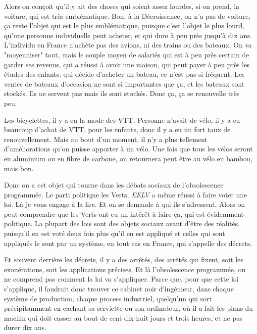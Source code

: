 \begin{small}
\smallbreak
Alors on conçoit qu'il y ait des choses qui soient assez lourdes, si on prend, la voiture, qui est très emblématique. Bon, à la Décroissance, on n'a pas de voiture, ça reste l'objet qui est le plus emblématique, puisque c'est l'objet le plus lourd, qu'une personne individuelle peut acheter, et qui dure à peu près jusqu'à dix ans. L'individu en France n'achète pas des avions, ni des trains ou des bateaux. On va "moyenniser" tout, mais le couple moyen de salariés qui est à peu près certain de garder ses revenus, qui a réussi à avoir une maison, qui peut payer à peu près les études des enfants, qui décide d'acheter un bateau, ce n’est pas si fréquent. Les ventes de bateaux d'occasion ne sont si importantes que ça, et les bateaux sont stockés. Ils ne servent pas mais ils sont stockés. Donc ça, ça se renouvelle très peu. 

Les bicyclettes, il y a eu la mode des VTT. Personne n'avait de vélo, il y a eu beaucoup d'achat de VTT, pour les enfants, donc il y a eu un fort taux de renouvellement. Mais au bout d'un moment, il n'y a plus tellement d'améliorations qu'on puisse apporter à un vélo. Une fois que tous les vélos seront en aluminium ou en fibre de carbone, on retournera peut être au vélo en bambou, mais bon. 

\smallbreak
Donc on a cet objet qui tourne dans les débats sociaux de l'obsolescence programmée. Le parti politique les Verts, \textit{EELV} a même réussi à faire voter une loi. Là je vous engage à la lire. Et on se demande à qui ils s'adressent. Alors on peut comprendre que les Verts ont eu un intérêt à faire ça, qui est évidemment politique. La plupart des lois sont des objets sociaux avant d'être des réalités, puisqu'il en est voté deux fois plus qu'il en est appliqué et celles qui sont appliqués le sont par un système, en tout cas en France, qui s'appelle des décrets. 

Et souvent derrière les décrets, il y a des arrêtés, des arrêtés qui fixent, soit les exonérations, soit les applications précises. Et là l'obsolescence programmée, on ne comprend pas comment la loi va s'appliquer. Parce que, pour que cette loi s'applique, il faudrait donc trouver ce cabinet noir d'ingénieur, dans chaque système de production, chaque process industriel, quelqu'un qui sort précipitamment en cachant sa serviette ou son ordinateur, où il a fait les plans du machin qui doit casser au bout de cent dix-huit jours et trois heures, et ne pas durer dix ans.

\vspace{1\baselineskip}


\end{small}
